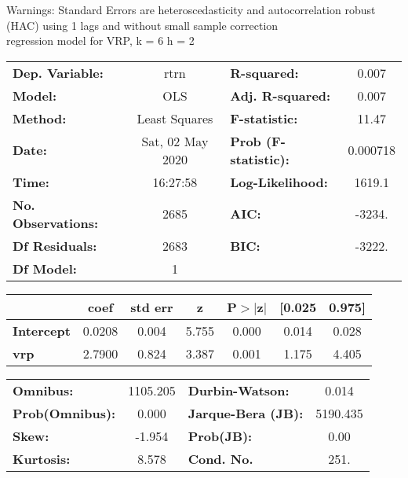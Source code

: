 Warnings: \newline
 [1] Standard Errors are heteroscedasticity and autocorrelation robust (HAC) using 1 lags and without small sample correction\\ 

regression model for VRP, k = 6 h = 2\begin{center}
\begin{tabular}{lclc}
\toprule
\textbf{Dep. Variable:}    &       rtrn       & \textbf{  R-squared:         } &     0.007   \\
\textbf{Model:}            &       OLS        & \textbf{  Adj. R-squared:    } &     0.007   \\
\textbf{Method:}           &  Least Squares   & \textbf{  F-statistic:       } &     11.47   \\
\textbf{Date:}             & Sat, 02 May 2020 & \textbf{  Prob (F-statistic):} &  0.000718   \\
\textbf{Time:}             &     16:27:58     & \textbf{  Log-Likelihood:    } &    1619.1   \\
\textbf{No. Observations:} &        2685      & \textbf{  AIC:               } &    -3234.   \\
\textbf{Df Residuals:}     &        2683      & \textbf{  BIC:               } &    -3222.   \\
\textbf{Df Model:}         &           1      & \textbf{                     } &             \\
\bottomrule
\end{tabular}
\begin{tabular}{lcccccc}
                   & \textbf{coef} & \textbf{std err} & \textbf{z} & \textbf{P$> |$z$|$} & \textbf{[0.025} & \textbf{0.975]}  \\
\midrule
\textbf{Intercept} &       0.0208  &        0.004     &     5.755  &         0.000        &        0.014    &        0.028     \\
\textbf{vrp}       &       2.7900  &        0.824     &     3.387  &         0.001        &        1.175    &        4.405     \\
\bottomrule
\end{tabular}
\begin{tabular}{lclc}
\textbf{Omnibus:}       & 1105.205 & \textbf{  Durbin-Watson:     } &    0.014  \\
\textbf{Prob(Omnibus):} &   0.000  & \textbf{  Jarque-Bera (JB):  } & 5190.435  \\
\textbf{Skew:}          &  -1.954  & \textbf{  Prob(JB):          } &     0.00  \\
\textbf{Kurtosis:}      &   8.578  & \textbf{  Cond. No.          } &     251.  \\
\bottomrule
\end{tabular}
\end{center}

